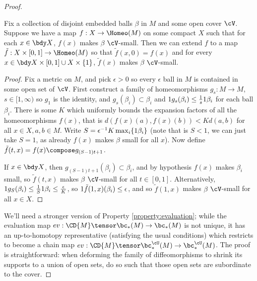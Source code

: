 \begin{proof}
\begin{lem}
\label{lem:extend-small-homeomorphisms}
Fix a collection of disjoint embedded balls $\beta$ in $M$ and some open cover $\cV$. Suppose we have a map $f :  X \to \Homeo(M)$ on some compact $X$ such that for each $x \in \bdy X$, $f(x)$ makes $\beta$ $\cV$-small. Then we can extend $f$ to a map $\tilde{f} : X \times [0,1] \to \Homeo(M)$ so that $\tilde{f}(x,0) = f(x)$ and for every $x \in \bdy X \times [0,1] \cup X \times \{1\}$, $\tilde{f}(x)$ makes $\beta$ $\cV$-small.
\end{lem}
\begin{proof}
Fix a metric on $M$, and pick $\epsilon > 0$ so every $\epsilon$ ball in $M$ is contained in some open set of $\cV$. First construct a family of homeomorphisms $g_s : M \to M$, $s \in [1,\infty)$ so $g_1$ is the identity, and $g_s(\beta_i) \subset \beta_i$ and $1 g_s(\beta_i) \leq \frac{1}{s} 1 \beta_i$ for each ball $\beta_i$. 
There is some $K$ which uniformly bounds the expansion factors of all the homeomorphisms $f(x)$, that is $d(f(x)(a), f(x)(b)) < K d(a,b)$ for all $x \in X, a,b \in M$. Write $S=\epsilon^{-1} K \max_i \{1 \beta_i\}$ (note that is $S<1$, we can just take $S=1$, as already $f(x)$ makes $\beta$ small for all $x$). Now define $\tilde{f}(t, x) = f(x) \compose g_{(S-1)t+1}$.

If $x \in \bdy X$, then $g_{(S-1)t+1}(\beta_i) \subset \beta_i$, and by hypothesis $f(x)$ makes $\beta_i$ small, so $\tilde{f}(t, x)$ makes $\beta$ $\cV$-small for all $t \in [0,1]$. Alternatively, $1 g_S(\beta_i) \leq \frac{1}{S} 1 \beta_i \leq \frac{\epsilon}{K}$, so $1 \tilde{f}(1,x)(\beta_i) \leq \epsilon$, and so $\tilde{f}(1,x)$ makes $\beta$ $\cV$-small for all $x \in X$.
\end{proof}

We'll need a stronger version of Property \ref{property:evaluation}; while the evaluation map $ev: \CD{M} \tensor \bc_*(M) \to \bc_*(M)$ is not unique, it has an up-to-homotopy representative (satisfying the usual conditions) which restricts to become a chain map $ev: \CD{M} \tensor \bc^{\cU}_*(M) \to \bc^{\cU}_*(M)$. The proof is straightforward: when deforming the family of diffeomorphisms to shrink its supports to a union of open sets, do so such that those open sets are subordinate to the cover.


\end{proof}
